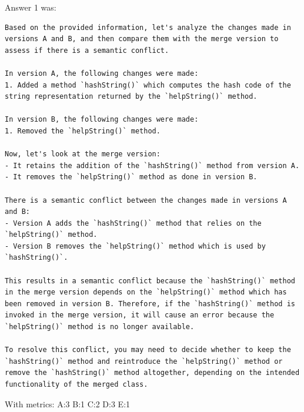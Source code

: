 Answer 1 was:
\begin{lstlisting}
Based on the provided information, let's analyze the changes made in versions A and B, and then compare them with the merge version to assess if there is a semantic conflict.

In version A, the following changes were made:
1. Added a method `hashString()` which computes the hash code of the string representation returned by the `helpString()` method.

In version B, the following changes were made:
1. Removed the `helpString()` method.

Now, let's look at the merge version:
- It retains the addition of the `hashString()` method from version A.
- It removes the `helpString()` method as done in version B.

There is a semantic conflict between the changes made in versions A and B:
- Version A adds the `hashString()` method that relies on the `helpString()` method.
- Version B removes the `helpString()` method which is used by `hashString()`.

This results in a semantic conflict because the `hashString()` method in the merge version depends on the `helpString()` method which has been removed in version B. Therefore, if the `hashString()` method is invoked in the merge version, it will cause an error because the `helpString()` method is no longer available.

To resolve this conflict, you may need to decide whether to keep the `hashString()` method and reintroduce the `helpString()` method or remove the `hashString()` method altogether, depending on the intended functionality of the merged class.
\end{lstlisting}

With metrics:
A:3
B:1
C:2
D:3
E:1

